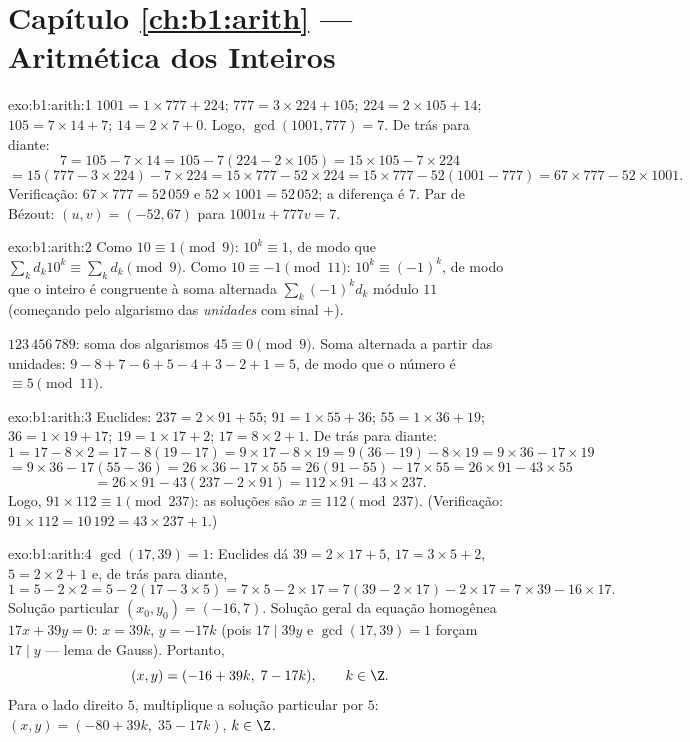 \section*{Capítulo \ref{ch:b1:arith} --- Aritmética dos Inteiros}

\begin{solution}{exo:b1:arith:1}
$1001 = 1 \times 777 + 224$; $777 = 3 \times 224 + 105$; $224 = 2
\times 105 + 14$; $105 = 7 \times 14 + 7$; $14 = 2 \times 7 + 0$. Logo,
$\gcd(1001, 777) = 7$. De trás para diante:
\[
7 = 105 - 7 \times 14
= 105 - 7(224 - 2\times 105) = 15 \times 105 - 7 \times 224
\]
\[
= 15(777 - 3\times 224) - 7\times 224 = 15 \times 777 - 52 \times 224
= 15 \times 777 - 52(1001 - 777) = 67 \times 777 - 52 \times 1001 .
\]
Verificação: $67 \times 777 = 52\,059$ e $52 \times 1001 = 52\,052$;
a diferença é $7$. Par de Bézout: $(u, v) = (-52, 67)$ para $1001u + 777v =
7$.
\end{solution}

\begin{solution}{exo:b1:arith:2}
Como $10 \equiv 1 \pmod 9$: $10^k \equiv 1$, de modo que $\sum_k d_k 10^k
\equiv \sum_k d_k \pmod 9$. Como $10 \equiv -1 \pmod{11}$: $10^k
\equiv (-1)^k$, de modo que o inteiro é congruente à soma alternada
$\sum_k (-1)^k d_k$ módulo $11$ (começando pelo algarismo das \emph{unidades}
com sinal $+$).

$123\,456\,789$: soma dos algarismos $45 \equiv 0 \pmod 9$. Soma alternada a partir
das unidades: $9 - 8 + 7 - 6 + 5 - 4 + 3 - 2 + 1 = 5$, de modo que o número é
$\equiv 5 \pmod{11}$.
\end{solution}

\begin{solution}{exo:b1:arith:3}
Euclides: $237 = 2 \times 91 + 55$; $91 = 1 \times 55 + 36$; $55 = 1
\times 36 + 19$; $36 = 1 \times 19 + 17$; $19 = 1 \times 17 + 2$; $17
= 8 \times 2 + 1$. De trás para diante:
\[
1 = 17 - 8\times 2 = 17 - 8(19 - 17) = 9\times 17 - 8\times 19
= 9(36 - 19) - 8\times 19 = 9\times 36 - 17\times 19
\]
\[
= 9\times 36 - 17(55 - 36) = 26\times 36 - 17\times 55
= 26(91 - 55) - 17\times 55 = 26\times 91 - 43\times 55
\]
\[
= 26\times 91 - 43(237 - 2\times 91) = 112 \times 91 - 43 \times 237.
\]
Logo, $91 \times 112 \equiv 1 \pmod{237}$: as soluções são $x \equiv
112 \pmod{237}$. (Verificação: $91 \times 112 = 10\,192 = 43 \times 237 +
1$.)
\end{solution}

\begin{solution}{exo:b1:arith:4}
$\gcd(17, 39) = 1$: Euclides dá $39 = 2\times 17 + 5$, $17 = 3\times
5 + 2$, $5 = 2\times 2 + 1$ e, de trás para diante,
\[
1 = 5 - 2\times 2 = 5 - 2(17 - 3\times 5) = 7\times 5 - 2\times 17
= 7(39 - 2\times 17) - 2\times 17 = 7\times 39 - 16\times 17 .
\]
Solução particular $(x_0, y_0) = (-16, 7)$. Solução geral da
equação homogênea $17x + 39y = 0$: $x = 39k$, $y = -17k$ (pois
$17 \mid 39y$ e $\gcd(17,39) = 1$ forçam $17 \mid y$ ---
lema de Gauss). Portanto,
\[
(x, y) = (-16 + 39k,\; 7 - 17k), \qquad k \in \Z .
\]
Para o lado direito $5$, multiplique a solução particular por $5$:
$(x, y) = (-80 + 39k,\; 35 - 17k)$, $k \in \Z$.
\end{solution}

